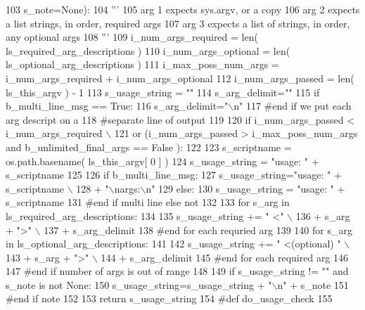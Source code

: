 \begin{DoxyCode}
103             s\_note=\textcolor{keywordtype}{None}):
104     \textcolor{stringliteral}{'''}
105 \textcolor{stringliteral}{    arg 1 expects sys.argv, or a copy}
106 \textcolor{stringliteral}{    arg 2 expects a list strings, in order, required args}
107 \textcolor{stringliteral}{    arg 3 expects a list of strings, in order, any optional args}
108 \textcolor{stringliteral}{    '''}
109     i\_num\_args\_required = len( ls\_required\_arg\_descriptions )
110     i\_num\_args\_optional = len( ls\_optional\_arg\_descriptions )
111     i\_max\_poss\_num\_args = i\_num\_args\_required + i\_num\_args\_optional 
112     i\_num\_args\_passed = len( ls\_this\_argv ) - 1  
113     s\_usage\_string = \textcolor{stringliteral}{""}
114     s\_arg\_delimit=\textcolor{stringliteral}{""}
115     \textcolor{keywordflow}{if} b\_multi\_line\_msg == \textcolor{keyword}{True}:
116         s\_arg\_delimit=\textcolor{stringliteral}{"\(\backslash\)n"}
117     \textcolor{comment}{#end if we put each arg descript on a }
118     \textcolor{comment}{#separate line of output}
119 
120     \textcolor{keywordflow}{if} i\_num\_args\_passed <  i\_num\_args\_required  \(\backslash\)
121             \textcolor{keywordflow}{or} (i\_num\_args\_passed > i\_max\_poss\_num\_args \textcolor{keywordflow}{and} b\_unlimited\_final\_args == \textcolor{keyword}{False} ): 
122     
123         s\_scriptname = os.path.basename( ls\_this\_argv[ 0 ] )    
124         s\_usage\_string = \textcolor{stringliteral}{"usage: "} + s\_scriptname 
125 
126         \textcolor{keywordflow}{if} b\_multi\_line\_msg:
127             s\_usage\_string=\textcolor{stringliteral}{"usage: "} + s\_scriptname \(\backslash\)
128                     + \textcolor{stringliteral}{"\(\backslash\)nargs:\(\backslash\)n"}
129         \textcolor{keywordflow}{else}:
130             s\_usage\_string = \textcolor{stringliteral}{"usage: "} + s\_scriptname 
131         \textcolor{comment}{#end if multi line else not}
132 
133         \textcolor{keywordflow}{for} s\_arg \textcolor{keywordflow}{in} ls\_required\_arg\_descriptions:
134 
135             s\_usage\_string += \textcolor{stringliteral}{" <"} \(\backslash\)
136                 + s\_arg + \textcolor{stringliteral}{">"} \(\backslash\)
137                 + s\_arg\_delimit
138         \textcolor{comment}{#end for each requried arg}
139 
140         \textcolor{keywordflow}{for} s\_arg \textcolor{keywordflow}{in} ls\_optional\_arg\_descriptions:
141 
142             s\_usage\_string += \textcolor{stringliteral}{" <(optional) "} \(\backslash\)
143                 + s\_arg + \textcolor{stringliteral}{">"} \(\backslash\)
144                 + s\_arg\_delimit
145         \textcolor{comment}{#end for each required arg}
146 
147     \textcolor{comment}{#end if number of args is out of range}
148 
149     \textcolor{keywordflow}{if} s\_usage\_string != \textcolor{stringliteral}{""} \textcolor{keywordflow}{and} s\_note \textcolor{keywordflow}{is} \textcolor{keywordflow}{not} \textcolor{keywordtype}{None}:
150         s\_usage\_string=s\_usage\_string + \textcolor{stringliteral}{"\(\backslash\)n"} + s\_note
151     \textcolor{comment}{#end if note }
152 
153     \textcolor{keywordflow}{return}  s\_usage\_string 
154 \textcolor{comment}{#def do\_usage\_check}
155 
\end{DoxyCode}
